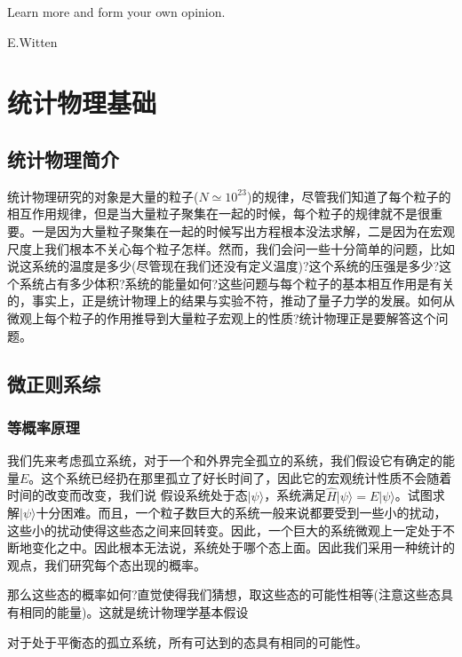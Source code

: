\documentclass[11pt]{ctexart}
\begin{document}
\titleTH

\newpage
\tableofcontents
\newpage
\epigraph{Learn more and form your own opinion.}{E.Witten}
\section{统计物理基础}
\subsection{统计物理简介}
统计物理研究的对象是大量的粒子($N\simeq 10^{23}$)的规律，尽管我们知道了每个粒子的相互作用规律，但是当大量粒子聚集在一起的时候，每个粒子的规律就不是很重要。一是因为大量粒子聚集在一起的时候写出方程根本没法求解，二是因为在宏观尺度上我们根本不关心每个粒子怎样。然而，我们会问一些十分简单的问题，比如说这系统的温度是多少(尽管现在我们还没有定义温度)?这个系统的压强是多少?这个系统占有多少体积?系统的能量如何?这些问题与每个粒子的基本相互作用是有关的，事实上，正是统计物理上的结果与实验不符，推动了量子力学的发展。如何从微观上每个粒子的作用推导到大量粒子宏观上的性质?统计物理正是要解答这个问题。
\newpage
\subsection{微正则系综}
\subsubsection{等概率原理}
我们先来考虑孤立系统，对于一个和外界完全孤立的系统，我们假设它有确定的能量$E$。这个系统已经扔在那里孤立了好长时间了，因此它的宏观统计性质不会随着时间的改变而改变，我们说
假设系统处于态$|\psi\rangle$，系统满足$\hat{H}|\psi\rangle = E|\psi\rangle$。试图求解$|\psi\rangle$十分困难。而且，一个粒子数巨大的系统一般来说都要受到一些小的扰动，这些小的扰动使得这些态之间来回转变。因此，一个巨大的系统微观上一定处于不断地变化之中。因此根本无法说，系统处于哪个态上面。因此我们采用一种统计的观点，我们研究每个态出现的概率。

那么这些态的概率如何?直觉使得我们猜想，取这些态的可能性相等(注意这些态具有相同的能量)。这就是统计物理学基本假设
\begin{assumption}[等概率原理]
对于处于平衡态的孤立系统，所有可达到的态具有相同的可能性。
\end{assumption}
\end{document}
